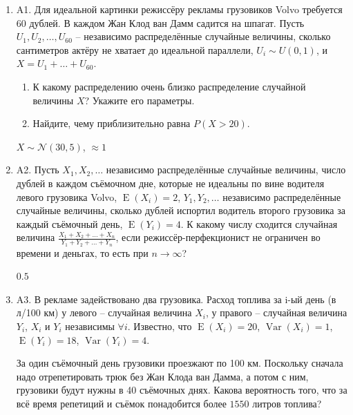 \documentclass[12pt]{article}
\DeclareMathOperator{\Var}{Var}
\DeclareMathOperator{\E}{E}
\def \P{P}
\def \cN{\mathcal{N}}
\newenvironment{problem}{}{}
\newenvironment{sol}{}{} %
\begin{document}
\begin{enumerate}
\begin{problem}
\item[A1.] Для идеальной картинки режиссёру рекламы грузовиков Volvo требуется 60 дублей. В каждом Жан Клод ван Дамм садится на шпагат. Пусть $U_1, U_2, \ldots, U_{60}$ – независимо распределённые случайные величины, сколько сантиметров актёру не хватает до идеальной параллели, $U_i \sim U(0,1)$, и $X=U_1 + \ldots + U_{60}$.

\begin{enumerate}
\item К какому распределению очень близко распределение случайной величины $X$? Укажите его параметры.
\item Найдите, чему приблизительно равна $\P(X > 20)$.
\end{enumerate}

\begin{sol}
$X \sim \cN(30,5)$, $\approx 1$
\end{sol}
\end{problem}

\begin{problem}
\item[A2.] Пусть $X_1, X_2, \ldots$ независимо распределённые случайные величины, число дублей в каждом съёмочном дне, которые не идеальны по вине водителя левого грузовика Volvo, $\E(X_i) = 2$, $Y_1, Y_2, \ldots$ независимо распределённые случайные величины, сколько дублей испортил водитель второго грузовика за каждый съёмочный день, $\E(Y_i) = 4$. К какому числу сходится случайная величина $\frac{X_1 + X_2 + \ldots + X_n}{Y_1 + Y_2 + \ldots + Y_n}$, если режиссёр-перфекционист не ограничен во времени и деньгах, то есть при $n \to \infty$?

\begin{sol}
$0.5$
\end{sol}
\end{problem}

\begin{problem}
\item[A3.] В рекламе задействовано два грузовика. Расход топлива за i-ый день (в л/100 км) у левого – случайная величина $X_i$, у правого – случайная величина $Y_i$, $X_i$ и $Y_i$ независимы $\forall i$. Известно, что $\E(X_i) = 20$, $\Var(X_i) = 1$, $\E(Y_i) = 18$, $\Var(Y_i) = 4$.

За один съёмочный день грузовики проезжают по 100 км. Поскольку сначала надо отрепетировать трюк без Жан Клода ван Дамма, а потом с ним, грузовики будут нужны в 40 съёмочных днях. Какова вероятность того, что за всё время репетиций и съёмок понадобится более $1550$ литров топлива?


\end{problem}
\end{enumerate}
\end{document}
